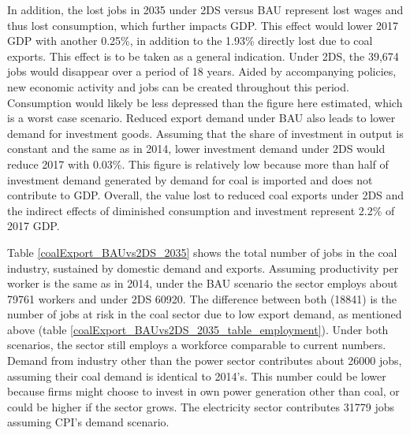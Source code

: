 \documentclass[12pt,english]{article}
\begin{document}
In addition, the lost jobs in 2035 under 2DS versus BAU represent lost wages and thus lost consumption, which further impacts GDP. This effect would lower 2017 GDP with another 0.25\%, in addition to the 1.93\% directly lost due to coal exports. This effect is to be taken as a general indication. Under 2DS, the 39,674 jobs would disappear over a period of 18 years. Aided by accompanying policies, new economic activity and jobs can be created throughout this period. Consumption would likely be less depressed than the figure here estimated, which is a worst case scenario. Reduced export demand under BAU also leads to lower demand for investment goods. Assuming that the share of investment in output is constant and the same as in 2014, lower investment demand under 2DS would reduce 2017 with 0.03\%. This figure is relatively low because more than half of investment demand generated by demand for coal is imported and does not contribute to GDP. Overall, the value lost to reduced coal exports under 2DS and the indirect effects of diminished consumption and investment represent 2.2\% of 2017 GDP.

Table \ref{coalExport_BAUvs2DS_2035} shows the total number of jobs in the coal industry, sustained by domestic demand and exports. Assuming productivity per worker is the same as in 2014, under the BAU scenario the sector employs about 79761 workers and under 2DS 60920. The difference between both (18841) is the number of jobs at risk in the coal sector due to low export demand, as mentioned above (table \ref{coalExport_BAUvs2DS_2035_table_employment}). Under both scenarios, the sector still employs a workforce comparable to current numbers. Demand from industry other than the power sector contributes about 26000 jobs, assuming their coal demand is identical to 2014's. This number could be lower because firms might choose to invest in own power generation other than coal, or could be higher if the sector grows. The electricity sector contributes 31779 jobs assuming CPI's demand scenario.



\end{document}
